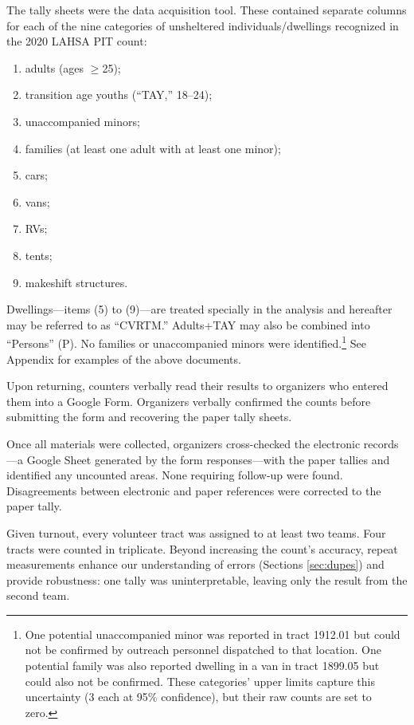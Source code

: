 \documentclass[11pt,twocolumn]{article}
\def\bfr{\bf\color{red}}
\def\Count{count}
\begin{document}
The tally sheets were the data acquisition tool. These contained separate columns for each of the 
nine categories of unsheltered individuals/dwellings recognized in the 2020 LAHSA PIT count: 
\begin{enumerate}
	\item adults (ages $\geq$25);
	\item transition age youths (``TAY,'' 18--24);
	\item unaccompanied minors;
	\item families (at least one adult with at least one minor); 
	\item cars;
	\item vans;
	\item RVs;
	\item tents;
	\item makeshift structures.
\end{enumerate}
Dwellings---items (5) to (9)---are treated specially in the analysis and hereafter 
may be referred to as ``CVRTM.'' Adults+TAY may also be combined into 
``Persons'' (P). No families or unaccompanied minors were identified.\footnote{
One potential unaccompanied minor was reported in tract 1912.01 but could not be confirmed by outreach
personnel dispatched to that location. One potential family was also reported dwelling in a van in
tract 1899.05 but could also not be confirmed. These categories' upper limits capture this 
uncertainty (3 each at 95\% confidence), but their raw counts are set to zero.} See Appendix for examples
of the above documents.

Upon returning, counters verbally read their results to organizers who entered them into a Google 
Form. Organizers verbally confirmed the counts before submitting the form and recovering the
paper tally sheets.

Once all materials were collected, organizers cross-checked the electronic records---a
Google Sheet generated by the form responses---with the paper tallies and identified any 
uncounted areas. None requiring follow-up were found. Disagreements between electronic 
and paper references were corrected to the paper tally. 

Given turnout, every volunteer tract was assigned to at least two teams. Four tracts were 
counted in triplicate. Beyond increasing the \Count's accuracy, repeat measurements 
enhance our understanding of errors (Sections \ref{sec:dupes}) and provide robustness: one 
tally was uninterpretable, leaving only the result from the second team.
\end{document}
